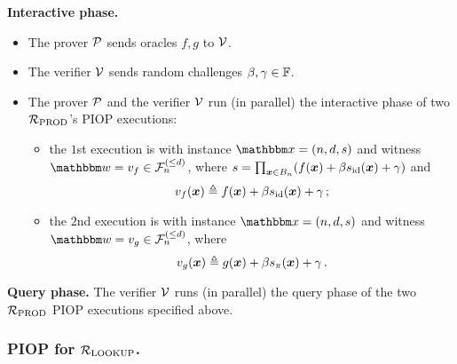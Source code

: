 \textbf{Interactive phase.} 
\begin{itemize}
    \item The prover $\mathcal{P}$ sends oracles $f, g$ to $\mathcal{V}$.
    \item The verifier $\mathcal{V}$ sends random challenges $\beta, \gamma \in \mathbb{F}$.
    \item The prover $\mathcal{P}$ and the verifier $\mathcal{V}$ run (in parallel) the interactive phase 
    of two ${\mathcal{R}}_{\text{PROD}}$'s PIOP executions:
        \begin{itemize}
            \item the $1$st execution is with instance $\instR = (n, d, s)$ and
                witness $\witR = v_{f} \in \bdp{n}{d}$, where 
                $
                    s = \prod_{\boldsymbol{x}\in B_{n}} (f(\boldsymbol{x}) + \beta s_{\text{id}}(\boldsymbol{x}) + \gamma)
                $ and
                \[
                    v_{f}(\boldsymbol{x}) \mathrel{\triangleq} f(\boldsymbol{x}) + \beta s_{\text{id}}(\boldsymbol{x}) + \gamma \,;
                \]
            \item the $2$nd execution is with instance $\instR = (n, d, s)$ and 
                witness $\witR = v_{g} \in \bdp{n}{d}$, where 
                \[
                    v_{g}(\boldsymbol{x}) \mathrel{\triangleq} g(\boldsymbol{x}) + \beta s_{\pi}(\boldsymbol{x}) + \gamma \,.
                \]
        \end{itemize}
\end{itemize}

\textbf{Query phase.}
The verifier $\mathcal{V}$ runs (in parallel) the query phase of the two ${\mathcal{R}}_{\text{PROD}}$ PIOP 
executions specified above.

\subsubsection*{PIOP for ${\mathcal{R}}_{\text{LOOKUP}}$.} 

